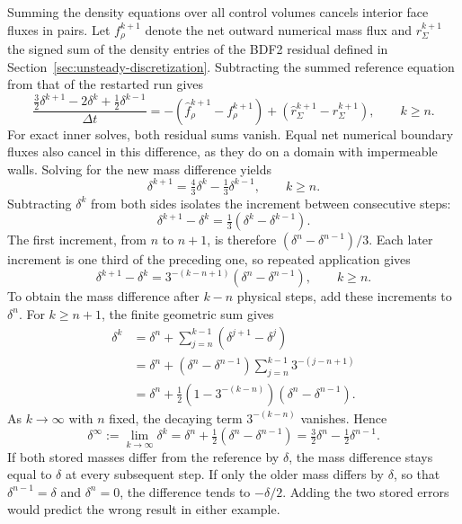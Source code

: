 \documentclass[a4paper,fleqn]{cas-sc}
\begin{document}
Summing the density equations over all control volumes cancels interior face fluxes in pairs. Let $f_\rho^{k+1}$ denote the net outward numerical mass flux and $r_\Sigma^{k+1}$ the signed sum of the density entries of the BDF2 residual defined in Section~\ref{sec:unsteady-discretization}. Subtracting the summed reference equation from that of the restarted run gives
\[
 \frac{\tfrac32\delta^{k+1}-2\delta^k+\tfrac12\delta^{k-1}}{\Delta t}
 =-(\widehat f_\rho^{k+1}-f_\rho^{k+1})
   +(\widehat r_\Sigma^{k+1}-r_\Sigma^{k+1}),\qquad k\ge n .
\]
For exact inner solves, both residual sums vanish. Equal net numerical boundary fluxes also cancel in this difference, as they do on a domain with impermeable walls.
Solving for the new mass difference yields
\begin{equation}
 \delta^{k+1}=\tfrac43\delta^k-\tfrac13\delta^{k-1},\qquad k\ge n.
 \label{eq:mass-first-step}
\end{equation}
Subtracting $\delta^k$ from both sides isolates the increment between consecutive steps:
\[
 \delta^{k+1}-\delta^k=\tfrac13(\delta^k-\delta^{k-1}).
\]
The first increment, from $n$ to $n+1$, is therefore $(\delta^n-\delta^{n-1})/3$. Each later increment is one third of the preceding one, so repeated application gives
\[
 \delta^{k+1}-\delta^k=3^{-(k-n+1)}(\delta^n-\delta^{n-1}),\qquad k\ge n.
\]
To obtain the mass difference after $k-n$ physical steps, add these increments to $\delta^n$. For $k\ge n+1$, the finite geometric sum gives
\[
\begin{aligned}
 \delta^k
 &=\delta^n+\sum_{j=n}^{k-1}(\delta^{j+1}-\delta^j)\\
 &=\delta^n+(\delta^n-\delta^{n-1})\sum_{j=n}^{k-1}3^{-(j-n+1)}\\
 &=\delta^n+\tfrac12\left(1-3^{-(k-n)}\right)(\delta^n-\delta^{n-1}).
\end{aligned}
\]
As $k\to\infty$ with $n$ fixed, the decaying term $3^{-(k-n)}$ vanishes. Hence
\begin{equation}
 \delta^\infty:=\lim_{k\to\infty}\delta^k
 =\delta^n+\tfrac12(\delta^n-\delta^{n-1})
 =\tfrac32\delta^n-\tfrac12\delta^{n-1}.
 \label{eq:mass-long-run}
\end{equation}
If both stored masses differ from the reference by $\delta$, the mass difference stays equal to $\delta$ at every subsequent step. If only the older mass differs by $\delta$, so that $\delta^{n-1}=\delta$ and $\delta^n=0$, the difference tends to $-\delta/2$. Adding the two stored errors would predict the wrong result in either example.
\end{document}
